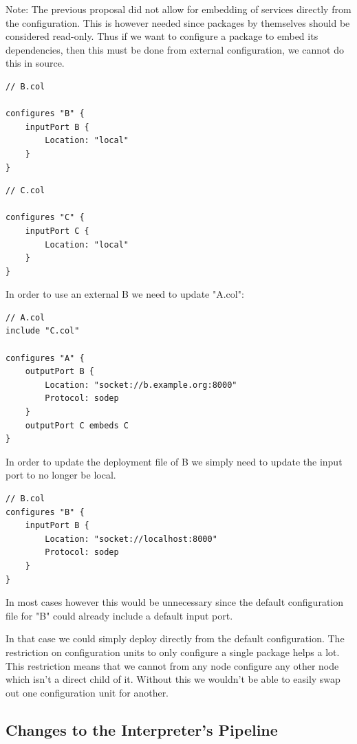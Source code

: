 Note: The previous proposal did not allow for embedding of services directly
from the configuration. This is however needed since packages by themselves
should be considered read-only. Thus if we want to configure a package to embed
its dependencies, then this must be done from external configuration, we cannot
do this in source.

\begin{verbatim}
// B.col

configures "B" {
    inputPort B {
        Location: "local"
    }
}
\end{verbatim}

\begin{verbatim}
// C.col

configures "C" {
    inputPort C {
        Location: "local"
    }
}
\end{verbatim}

In order to use an external B we need to update "A.col":

\begin{verbatim}
// A.col
include "C.col"

configures "A" {
    outputPort B {
        Location: "socket://b.example.org:8000"
        Protocol: sodep
    }
    outputPort C embeds C
}
\end{verbatim}

In order to update the deployment file of B we simply need to update the
input port to no longer be local.

\begin{verbatim}
// B.col
configures "B" {
    inputPort B {
        Location: "socket://localhost:8000"
        Protocol: sodep
    }
}
\end{verbatim}

In most cases however this would be unnecessary since the default
configuration file for "B" could already include a default input port.

In that case we could simply deploy directly from the default configuration.
The restriction on configuration units to only configure a single package helps
a lot. This restriction means that we cannot from any node configure any other
node which isn't a direct child of it. Without this we wouldn't be able to
easily swap out one configuration unit for another.

\subsection{Changes to the Interpreter's Pipeline}

